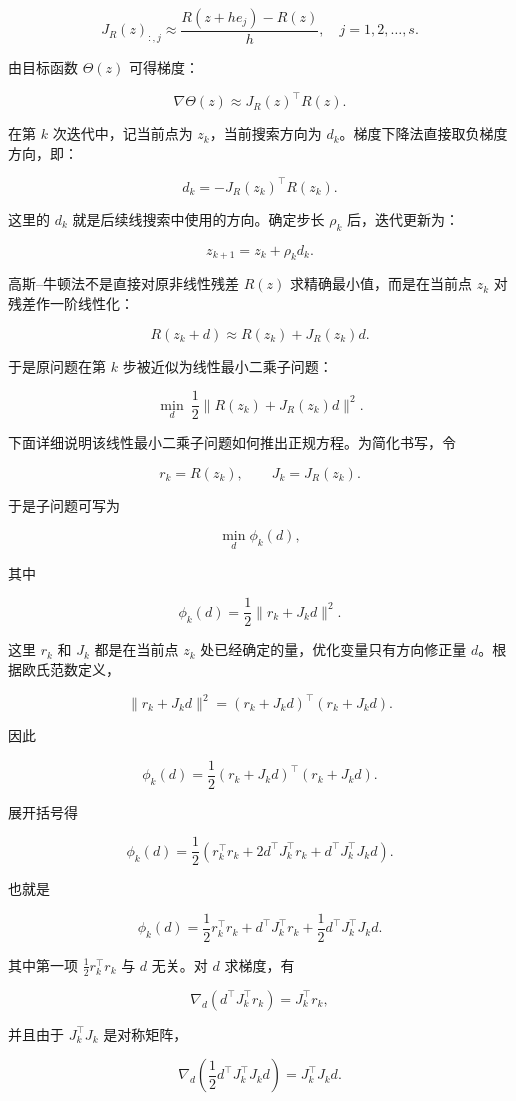 \documentclass[UTF8,a4paper,zihao=-4]{ctexart}
\begin{document}
\[
J_R(z)_{:,j}\approx \frac{R(z+he_j)-R(z)}{h},\quad j=1,2,\ldots,s.
\]

由目标函数 $\Theta(z)$ 可得梯度：

\[
\nabla\Theta(z)\approx J_R(z)^\top R(z).
\]

在第 $k$ 次迭代中，记当前点为 $z_k$，当前搜索方向为 $d_k$。梯度下降法直接取负梯度方向，即：

\[
d_k=-J_R(z_k)^\top R(z_k).
\]

这里的 $d_k$ 就是后续线搜索中使用的方向。确定步长 $\rho_k$ 后，迭代更新为：

\[
z_{k+1}=z_k+\rho_k d_k.
\]

高斯--牛顿法不是直接对原非线性残差 $R(z)$ 求精确最小值，而是在当前点 $z_k$ 对残差作一阶线性化：

\[
R(z_k+d)\approx R(z_k)+J_R(z_k)d.
\]

于是原问题在第 $k$ 步被近似为线性最小二乘子问题：

\[
\min_d\ \frac{1}{2}\|R(z_k)+J_R(z_k)d\|^2.
\]

下面详细说明该线性最小二乘子问题如何推出正规方程。为简化书写，令

\[
r_k=R(z_k),\qquad J_k=J_R(z_k).
\]

于是子问题可写为

\[
\min_d \phi_k(d),
\]

其中

\[
\phi_k(d)=\frac{1}{2}\|r_k+J_kd\|^2.
\]

这里 $r_k$ 和 $J_k$ 都是在当前点 $z_k$ 处已经确定的量，优化变量只有方向修正量 $d$。根据欧氏范数定义，

\[
\|r_k+J_kd\|^2=(r_k+J_kd)^\top(r_k+J_kd).
\]

因此

\[
\phi_k(d)=\frac{1}{2}(r_k+J_kd)^\top(r_k+J_kd).
\]

展开括号得

\[
\phi_k(d)
=
\frac{1}{2}
\left(
r_k^\top r_k
+2d^\top J_k^\top r_k
+d^\top J_k^\top J_kd
\right).
\]

也就是

\[
\phi_k(d)
=
\frac{1}{2}r_k^\top r_k
+d^\top J_k^\top r_k
+\frac{1}{2}d^\top J_k^\top J_kd.
\]

其中第一项 $\frac{1}{2}r_k^\top r_k$ 与 $d$ 无关。对 $d$ 求梯度，有

\[
\nabla_d\left(d^\top J_k^\top r_k\right)=J_k^\top r_k,
\]

并且由于 $J_k^\top J_k$ 是对称矩阵，

\[
\nabla_d\left(\frac{1}{2}d^\top J_k^\top J_kd\right)
=J_k^\top J_kd.
\]
\end{document}
